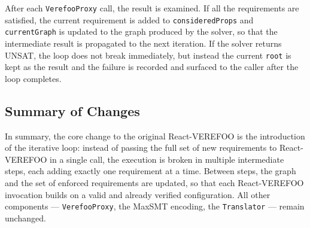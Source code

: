 
After each \texttt{VerefooProxy} call, the result is examined. If all the requirements are satisfied, the current requirement is added to \texttt{consideredProps} and \texttt{currentGraph} is updated to the graph produced by the solver, so that the intermediate result is propagated to the next iteration. If the solver returns UNSAT, the loop does not break immediately, but instead the current \texttt{root} is kept as the result and the failure is recorded and surfaced to the caller after the loop completes.






\subsection{Summary of Changes}

In summary, the core change to the original React-VEREFOO is the introduction of the iterative loop: instead of passing the full set of new requirements to React-VEREFOO in a single call, the execution is broken in multiple intermediate steps, each adding exactly one requirement at a time. Between steps, the graph and the set of enforced requirements are updated, so that each React-VEREFOO invocation builds on a valid and already verified configuration. All other components — \texttt{VerefooProxy}, the MaxSMT encoding, the \texttt{Translator} — remain unchanged.


